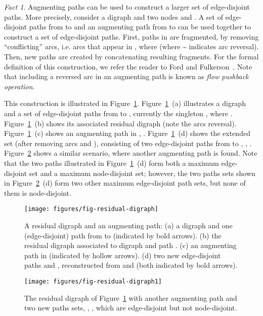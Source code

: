 \documentclass[preliminary,copyright,creativecommons]{eptcs}
\theoremstyle{remark}
\newtheorem{fact}[theorem]{Fact}
\begin{document}
\begin{fact}
\label{fact-augmenting}
Augmenting paths can be used to construct a larger set of edge-disjoint paths.
More precisely, consider a digraph  and two nodes  and .
A set  of  edge-disjoint paths from  to 
and an augmenting path  from  to 
can be used together to construct a set  of  edge-disjoint paths.
First, paths in  are fragmented, by 
removing ``conflicting'' arcs, i.e. arcs that appear in ,
where  (where \~{} indicates arc reversal).
Then, new paths are created by concatenating resulting fragments.
For the formal definition of this construction,
we refer the reader to Ford and Fulkerson~\cite{FordF1956}.
Note that including a reversed arc in an augmenting path
is known as \emph{flow pushback operation}.
\end{fact}

This construction is illustrated in Figure~\ref{fig-residual-digraph}.
Figure~\ref{fig-residual-digraph}~(a) illustrates a digraph  and 
a set  of edge-disjoint paths from  to ,
currently the singleton , where .
Figure~\ref{fig-residual-digraph}~(b) shows its associated residual digraph  
(note the arcs reversal).
Figure~\ref{fig-residual-digraph}~(c) shows an augmenting path  in , 
.
Figure~\ref{fig-residual-digraph}~(d) shows the extended set  
(after removing arcs  and ),
consisting of two edge-disjoint paths from  to , 
, .
Figure~\ref{fig-residual-digraph1} shows a similar scenario, 
where another augmenting path is found.
Note that the two paths illustrated in Figure~\ref{fig-residual-digraph}~(d)
form both a maximum edge-disjoint set and a maximum node-disjoint set;
however, the two paths sets shown in Figure~\ref{fig-residual-digraph1}~(d)
form two other maximum edge-disjoint path sets, but none of them is node-disjoint.

\begin{figure}[h]
\centerline{\texttt{[image: figures/fig-residual-digraph]}}
\caption{A residual digraph and an augmenting path: 
(a) a digraph  and one (edge-disjoint) path  from  to  (indicated by bold arrows).
(b) the residual digraph  associated to digraph  and path .
(c) an augmenting path  in   (indicated by hollow arrows).
(d) two new edge-disjoint paths  and ,
reconstructed from  and  (both indicated by bold arrows).}
\label{fig-residual-digraph}
\end{figure}

\begin{figure}[h]
\centerline{\texttt{[image: figures/fig-residual-digraph1]}}
\caption{The residual digraph of Figure~\ref{fig-residual-digraph} 
with another augmenting path and two new paths sets, 
, ,
which are edge-disjoint but not node-disjoint.}
\label{fig-residual-digraph1}
\end{figure}
\end{document}
